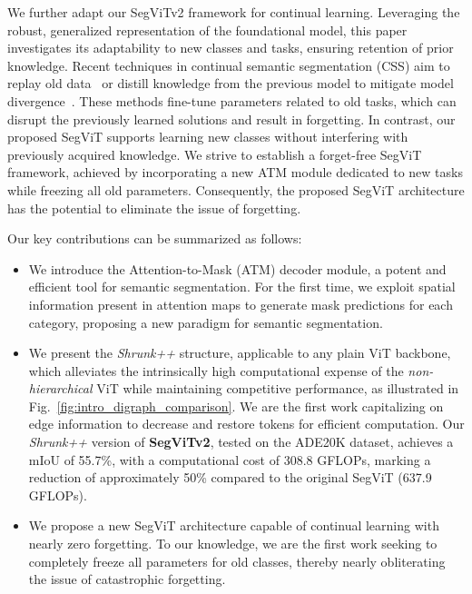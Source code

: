 We further adapt our SegViTv2 framework for continual learning. Leveraging the robust, generalized representation of the foundational model, this paper investigates its adaptability to new classes and tasks, ensuring retention of prior knowledge. Recent techniques in continual semantic segmentation (CSS) aim to replay old data~\cite{maracani2021RECALLRC, cha2021ssul} or distill knowledge from the previous model to mitigate model divergence~\cite{cermelli2020ModelingTB, phan2022class, zhang2022representation}. These methods fine-tune parameters related to old tasks, which can disrupt the previously learned solutions and result in forgetting. In contrast, our proposed SegViT supports learning new classes without interfering with previously acquired knowledge. We strive to establish a forget-free SegViT framework, achieved by incorporating a new ATM module dedicated to new tasks while freezing all old parameters. Consequently, the proposed SegViT architecture has the potential to eliminate the issue of forgetting.

Our key contributions can be summarized as follows:

\begin{itemize}
    \item  We introduce the Attention-to-Mask (ATM) decoder module, a potent and efficient tool for semantic segmentation. For the first time, we exploit spatial information present in attention maps to generate mask predictions for each category, proposing a new paradigm for semantic segmentation.
    \item We present the \emph{Shrunk++} structure, applicable to any plain ViT backbone, which alleviates the intrinsically high computational expense of the \textit{non-hierarchical} ViT while maintaining competitive performance, as illustrated in Fig.~\ref{fig:intro_digraph_comparison}. We are the first work capitalizing on edge information to decrease and restore tokens for efficient computation. Our \emph{Shrunk++} version of \textbf{SegViTv2}, tested on the ADE20K dataset, achieves a mIoU of 55.7\%, with a computational cost of 308.8 GFLOPs, marking a reduction of approximately 50\% compared to the original SegViT (637.9 GFLOPs).
    \item We propose a new SegViT architecture capable of continual learning with nearly zero forgetting. To our knowledge, we are the first work seeking to completely freeze all parameters for old classes, thereby nearly obliterating the issue of catastrophic forgetting.
\end{itemize}










